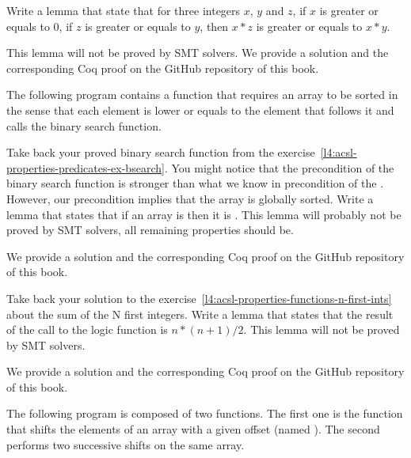 


Write a lemma that state that for three integers $x$, $y$ and $z$, if $x$ is
greater or equals to $0$, if $z$ is greater or equals to $y$, then $x * z$ is
greater or equals to $x * y$.


This lemma will not be proved by SMT solvers. We provide a solution and the
corresponding Coq proof on the GitHub repository of this book.


\label{l4:acsl-properties-lemmas-lsorted-gsorted}


The following program contains a function that requires an array to be sorted
in the sense that each element is lower or equals to the element that follows it
and calls the binary search function.




Take back your proved binary search function from the
exercise~\ref{l4:acsl-properties-predicates-ex-bsearch}. You might notice that
the precondition of the binary search function is stronger than what we know in
precondition of the . However, our precondition
implies that the array is globally sorted. Write a lemma that states that if
an array is  then it is .
This lemma will probably not be proved by SMT solvers, all remaining properties
should be.

We provide a solution and the corresponding Coq proof on the GitHub repository
of this book.


\label{l4:acsl-properties-lemmas-n-first-ints}

Take back your solution to the
exercise~\ref{l4:acsl-properties-functions-n-first-ints} about the sum of the
N first integers. Write a lemma that states that the result of the call to the
logic function is $n*(n+1)/2$. This lemma will not be proved by SMT solvers.


We provide a solution and the corresponding Coq proof on the GitHub repository
of this book.


\label{l4:acsl-properties-lemmas-shift-trans}


The following program is composed of two functions. The first one is the
 function that shifts the elements of an array with a
given offset (named ). The second performs two successive
shifts on the same array.


